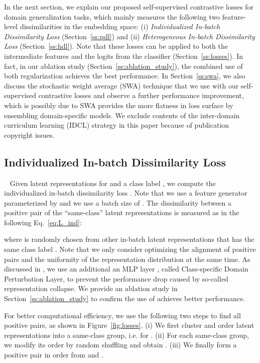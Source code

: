 \documentclass[10pt,twocolumn,letterpaper]{article}
\begin{document}
In the next section, we explain our proposed self-supervised contrastive losses for domain generalization tasks, which mainly measures the following two feature-level dissimilarities in the embedding space: (i) {\em Individualized In-batch Dissimilarity Loss} (Section~\ref{ss:pdl}) and (ii) {\em Heterogeneous In-batch Dissimilarity Loss} (Section~\ref{ss:hdl}). Note that these losses can be applied to both the intermediate features and the logits from the classifier (Section~\ref{ss:losses}). In fact, in our ablation study (Section~\ref{ss:ablation_study}), the combined use of both regularization achieves the best performance. In Section~\ref{ss:swa}, we also discuss the stochastic weight average (SWA) technique that we use with our self-supervised contrastive losses and observe a further performance improvement, which is possibly due to SWA provides the more flatness in loss surface by ensembling domain-specific models. 
We exclude contents of the inter-domain curriculum learning (IDCL) strategy in this paper because of publication copyright issues.

\subsection{Individualized In-batch Dissimilarity Loss}~\label{ss:pdl}
Given latent representations  for  and a class label , we compute the individualized in-batch dissimilarity loss . Note that we use a feature generator  parameterized by  and we use a batch size of . The dissimilarity between a positive pair of the ``same-class'' latent representations is measured as in the following Eq.~\ref{eq:L_ind}:

where  is randomly chosen from other in-batch latent representations  that has the same class label . Note that we only consider optimizing the alignment of positive pairs and the uniformity of the representation distribution at the same time. As discussed in \cite{grill2020bootstrap}, we use an additional an MLP layer , called Class-specific Domain Perturbation Layer, to prevent the performance drop caused by so-called representation collapse. We provide an ablation study in Section~\ref{ss:ablation_study} to confirm the use of  achieves better performance.  

For better computational efficiency, we use the following two steps to find all positive pairs, as shown in Figure~\ref{fig:losses}. (i) We first cluster and order latent representations  into a same-class group, i.e.  for . (ii) For each same-class group, we modify its order by random shuffling and obtain . (iii) We finally form a positive pair in order from  and . 
\end{document}
